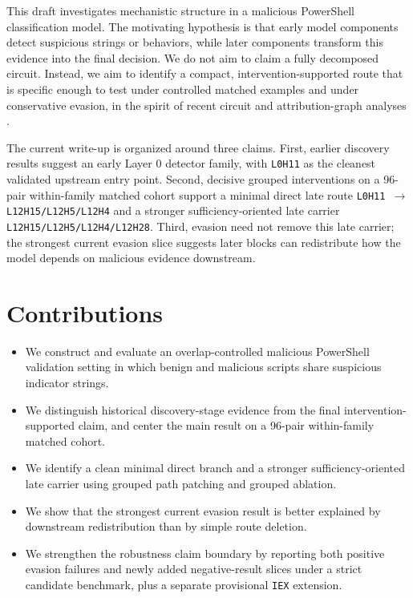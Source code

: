 \documentclass{article}
\begin{document}
This draft investigates mechanistic structure in a malicious PowerShell classification model. The motivating hypothesis is that early model components detect suspicious strings or behaviors, while later components transform this evidence into the final decision. We do not aim to claim a fully decomposed circuit. Instead, we aim to identify a compact, intervention-supported route that is specific enough to test under controlled matched examples and under conservative evasion, in the spirit of recent circuit and attribution-graph analyses \citep{ameisen2025attributiongraphs,lindsey2025biology}.

The current write-up is organized around three claims. First, earlier discovery results suggest an early Layer 0 detector family, with \texttt{L0H11} as the cleanest validated upstream entry point. Second, decisive grouped interventions on a 96-pair within-family matched cohort support a minimal direct late route \texttt{L0H11 $\rightarrow$ L12H15/L12H5/L12H4} and a stronger sufficiency-oriented late carrier \texttt{L12H15/L12H5/L12H4/L12H28}. Third, evasion need not remove this late carrier; the strongest current evasion slice suggests later blocks can redistribute how the model depends on malicious evidence downstream.

\section{Contributions}
\begin{itemize}[leftmargin=1.5em]
  \item We construct and evaluate an overlap-controlled malicious PowerShell validation setting in which benign and malicious scripts share suspicious indicator strings.
  \item We distinguish historical discovery-stage evidence from the final intervention-supported claim, and center the main result on a 96-pair within-family matched cohort.
  \item We identify a clean minimal direct branch and a stronger sufficiency-oriented late carrier using grouped path patching and grouped ablation.
  \item We show that the strongest current evasion result is better explained by downstream redistribution than by simple route deletion.
  \item We strengthen the robustness claim boundary by reporting both positive evasion failures and newly added negative-result slices under a strict candidate benchmark, plus a separate provisional \texttt{IEX} extension.
\end{itemize}
\end{document}
